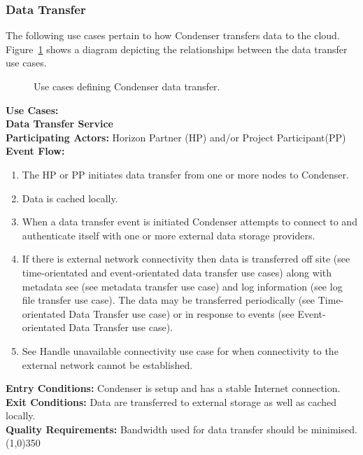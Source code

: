 \subsubsection{Data Transfer}		
The following use cases pertain to how Condenser transfers data to the cloud. Figure~\ref{DataTransferUse} shows a diagram depicting the relationships between the data transfer use cases.
\begin{center}
	\begin{figure}[htbp]
		\caption{Use cases defining Condenser data transfer.\label{DataTransferUse}}
	\end{figure}
\end{center}	
\textbf{Use Cases:}\\
 
		\textbf{Data Transfer Service}\\	 
		\textbf{Participating Actors:} Horizon Partner (HP) and/or Project Participant(PP) \\
		\textbf{Event Flow:}
		\begin{enumerate}
\item The HP or PP initiates data transfer from one or more nodes to Condenser.
\item Data is cached locally.
\item When a data transfer event is initiated Condenser attempts to connect to and authenticate itself with one or more external data storage providers.
\item If there is external network connectivity then data is transferred off site (see time-orientated and event-orientated data transfer use cases) along with metadata see (see metadata transfer use case) and log information (see log file transfer use case). The data may be transferred periodically (see Time-orientated Data Transfer use case) or in response to events (see Event-orientated Data Transfer use case). 
\item See Handle unavailable connectivity use case for when connectivity to the external network cannot be established.
	    \end{enumerate}
		\textbf{Entry Conditions:} Condenser is setup and has a stable Internet connection.\\
		\textbf{Exit Conditions:} Data are transferred to external storage as well as cached locally.\\
		\textbf{Quality Requirements:} Bandwidth used for data transfer should be minimised.\\
		\line(1,0){350}	
 
